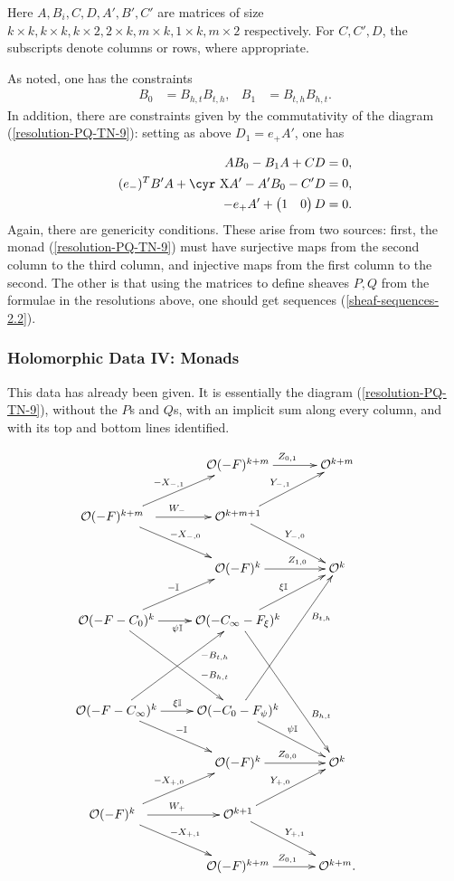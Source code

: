 \documentclass[12pt]{article}
\theoremstyle{definition}
\theoremstyle{remark}
\numberwithin{theorem}{section}
\newcommand{\Sh}{\hbox{\cyr X}}
\def\bI{{\mathbb {I}}}
\def\pO{{\mathcal O}}
\begin{document}
  
Here $A,B_i,C ,D ,A ',B ',C' $ are matrices of size $k\times k,k\times k, k\times 2,2\times k, m\times k,1\times k, m\times 2$ respectively. For $C,C' ,D$, the subscripts denote columns or rows, where appropriate.

As noted, one has the constraints
\begin{align}
  B_{0}&= B_{h,t}B_{t,h},& B_1&=B_{t,h}B_{h,t} .
\end{align}
In addition, there are constraints given by the commutativity of the diagram (\ref{resolution-PQ-TN-9}): setting as above $D_{ 1} = e_+A' $, one has

\begin{align}\label{monad-Taub}
A B_0-B_{1}A  + C D &=0,                                           \\
  (e_-)^TB'A  + \Sh A ' - A 'B_0 -C'D&=0,   \\
   -e_+ A'+   \begin{pmatrix}1&0\end{pmatrix}   D&=0.                                    
  \end{align}
Again, there are genericity conditions. These arise from two sources: first, the monad (\ref{resolution-PQ-TN-9}) must  have surjective maps from the second column to the third column, and injective maps from the first column to the second. The other is that using the matrices to define sheaves $P, Q$ from the formulae in the resolutions above, one should get sequences (\ref{sheaf-sequences-2.2}). 

\subsubsection{Holomorphic Data IV: Monads}
%
This data has already been given. It is essentially the diagram  (\ref{resolution-PQ-TN-9}), without the $P$s and $Q$s,  with an implicit sum along every column, and with its top and bottom lines identified.

   \begin{equation} \label{resolution-PQ-TN-10}\xymatrix{  
 & \pO(-F)^{k+m} \ar[r]^{Z_{ 0,1} } &\pO^{k+m}\\
 \pO(-F)^{k+m}\ \  \ar[dr]^{-X_{-,0} }\ar[r]^{W_{ -}}\ar[ur]^{-X_{-,1} }& \pO^{k+m+1} \ar[dr]^{Y_{ -,0} }\ar[ur]^{Y_{ -,1} }\\ 
 &  \pO(-F)^{k } \ar[r]^(0.6){Z_{ 1,0}} &\pO^{k} \\ 
  \pO(-F-C_0)^{k}\ar[ur]^{- \bI} \ar[ddr]^(0.7){-B_{h,t}}\ar[r]_(0.5){\psi\bI} &  \pO(-C_\infty-F_\xi)^{k}\ar[ur]^{\xi\bI}  \ar[rddd]^(0.7){ B_{h,t}}  \\
 &&&\\
   \pO(-F-C_\infty)^{k}\ar[dr]^{-\bI} \ar[uur]_(0.7){- B_{t,h}}\ar[r]^(0.5){\xi\bI} &  \pO(-C_0-F_\psi)^{k}\ar[dr]^{\psi\bI}  \ar[ruuu]_(0.7){ B_{t,h}}  \\
 & \pO(-F)^{k }\ar[r]^{Z_{0,0}} &\pO^{k}   \\
 \pO(-F)^{k }\ \ \ar[dr]^{-X_{ +,1}  } \ar[r]^{W_{+}}\ar[ur]^{-X_{+,0} }&   \pO^{k+1}\ar[dr]^{Y_{+,1}}\ar[ur]^{Y_{+,0}}\\
 & \pO(-F)^{k+m} \ar[r]^{Z_{ 0,1} } &\pO^{k+m}.
 }
\end{equation}
\end{document}
